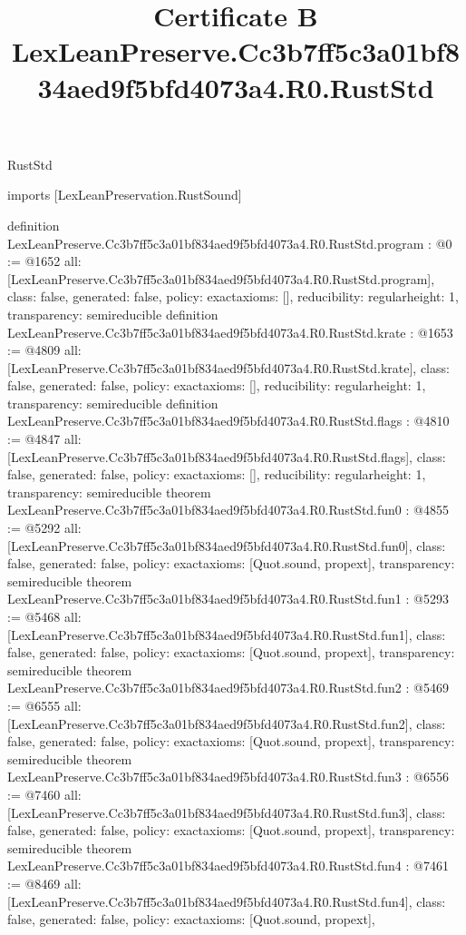 \begin{lexlean}{RustStd}
\title{Certificate B LexLeanPreserve.Cc3b7ff5c3a01bf834aed9f5bfd4073a4.R0.RustStd}
\begin{coremodule}
imports [LexLeanPreservation.RustSound]

definition LexLeanPreserve.Cc3b7ff5c3a01bf834aed9f5bfd4073a4.R0.RustStd.program : @0 := @1652 {
  all: [LexLeanPreserve.Cc3b7ff5c3a01bf834aed9f5bfd4073a4.R0.RustStd.program],
  class: false,
  generated: false,
  policy: exact{axioms: []},
  reducibility: regular{height: 1},
  transparency: semireducible
}
definition LexLeanPreserve.Cc3b7ff5c3a01bf834aed9f5bfd4073a4.R0.RustStd.krate : @1653 := @4809 {
  all: [LexLeanPreserve.Cc3b7ff5c3a01bf834aed9f5bfd4073a4.R0.RustStd.krate],
  class: false,
  generated: false,
  policy: exact{axioms: []},
  reducibility: regular{height: 1},
  transparency: semireducible
}
definition LexLeanPreserve.Cc3b7ff5c3a01bf834aed9f5bfd4073a4.R0.RustStd.flags : @4810 := @4847 {
  all: [LexLeanPreserve.Cc3b7ff5c3a01bf834aed9f5bfd4073a4.R0.RustStd.flags],
  class: false,
  generated: false,
  policy: exact{axioms: []},
  reducibility: regular{height: 1},
  transparency: semireducible
}
theorem LexLeanPreserve.Cc3b7ff5c3a01bf834aed9f5bfd4073a4.R0.RustStd.fun0 : @4855 := @5292 {
  all: [LexLeanPreserve.Cc3b7ff5c3a01bf834aed9f5bfd4073a4.R0.RustStd.fun0],
  class: false,
  generated: false,
  policy: exact{axioms: [Quot.sound, propext]},
  transparency: semireducible
}
theorem LexLeanPreserve.Cc3b7ff5c3a01bf834aed9f5bfd4073a4.R0.RustStd.fun1 : @5293 := @5468 {
  all: [LexLeanPreserve.Cc3b7ff5c3a01bf834aed9f5bfd4073a4.R0.RustStd.fun1],
  class: false,
  generated: false,
  policy: exact{axioms: [Quot.sound, propext]},
  transparency: semireducible
}
theorem LexLeanPreserve.Cc3b7ff5c3a01bf834aed9f5bfd4073a4.R0.RustStd.fun2 : @5469 := @6555 {
  all: [LexLeanPreserve.Cc3b7ff5c3a01bf834aed9f5bfd4073a4.R0.RustStd.fun2],
  class: false,
  generated: false,
  policy: exact{axioms: [Quot.sound, propext]},
  transparency: semireducible
}
theorem LexLeanPreserve.Cc3b7ff5c3a01bf834aed9f5bfd4073a4.R0.RustStd.fun3 : @6556 := @7460 {
  all: [LexLeanPreserve.Cc3b7ff5c3a01bf834aed9f5bfd4073a4.R0.RustStd.fun3],
  class: false,
  generated: false,
  policy: exact{axioms: [Quot.sound, propext]},
  transparency: semireducible
}
theorem LexLeanPreserve.Cc3b7ff5c3a01bf834aed9f5bfd4073a4.R0.RustStd.fun4 : @7461 := @8469 {
  all: [LexLeanPreserve.Cc3b7ff5c3a01bf834aed9f5bfd4073a4.R0.RustStd.fun4],
  class: false,
  generated: false,
  policy: exact{axioms: [Quot.sound, propext]},
}
\end{coremodule}
\end{lexlean}
